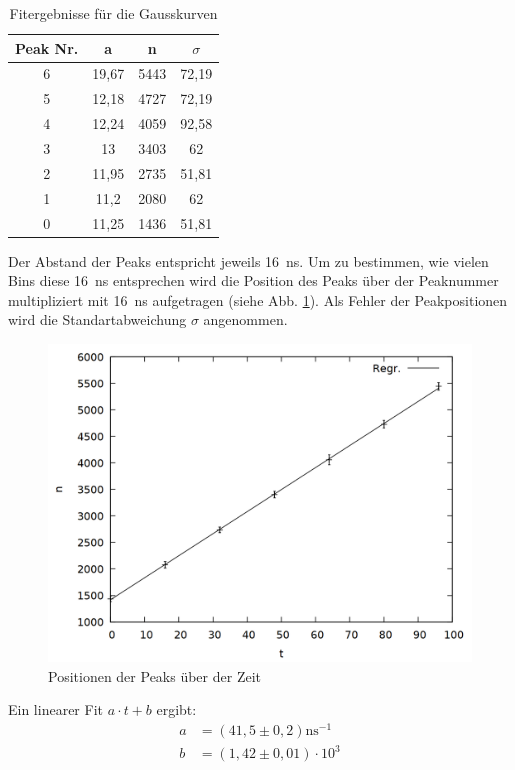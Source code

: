 \begin{table}
\centering
\caption{Fitergebnisse für die Gausskurven}
\begin{tabular}{cccc}
\toprule
Peak Nr. & a & n & $\sigma$\\
\midrule
6&	19,67&	5443&	72,19\\
5&	12,18&	4727&	72,19\\
4&	12,24&	4059&	92,58\\
3&	13&	3403&	62\\
2&	11,95&	2735&	51,81\\
1&	11,2&	2080&	62\\
0&	11,25&	1436&	51,81\\
\bottomrule
\end{tabular}
\label{tab:prompt}
\end{table}

Der Abstand der Peaks entspricht jeweils \SI{16}{\nano\second}. Um zu bestimmen, wie vielen Bins diese \SI{16}{\nano\second} entsprechen wird die Position des Peaks über der Peaknummer multipliziert mit \SI{16}{\nano\second} aufgetragen (siehe Abb. \ref{fig:prompt_time}). Als Fehler der Peakpositionen wird die Standartabweichung $\sigma$ angenommen.  

\begin{figure}
\centering
\includegraphics[width=0.7\linewidth]{data/prompt_time.png}
\caption{Positionen der Peaks über der Zeit}
\label{fig:prompt_time}
\end{figure}

Ein linearer Fit $a\cdot t + b$ ergibt:\\
\begin{align*}
a &= (41,5 \pm 0,2) \si{\nano\second}^{-1}\\
b &= (1,42 \pm 0,01) \cdot 10^{3}\\
\end{align*}

